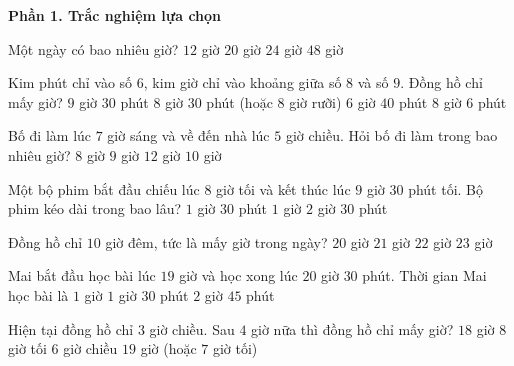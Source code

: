 \textbf{Phần 1. Trắc nghiệm lựa chọn}

\begin{ex} %
Một ngày có bao nhiêu giờ?
\choice
{$12$ giờ}
{$20$ giờ}
{\True $24$ giờ}
{$48$ giờ}
\end{ex}

\begin{ex} %
Kim phút chỉ vào số $6$, kim giờ chỉ vào khoảng giữa số $8$ và số $9$. Đồng hồ chỉ mấy giờ?
\choice
{$9$ giờ $30$ phút}
{\True $8$ giờ $30$ phút (hoặc $8$ giờ rưỡi)}
{$6$ giờ $40$ phút}
{$8$ giờ $6$ phút}
\end{ex}

\begin{ex} %
Bố đi làm lúc $7$ giờ sáng và về đến nhà lúc $5$ giờ chiều. Hỏi bố đi làm trong bao nhiêu giờ?
\choice
{$8$ giờ}
{$9$ giờ}
{$12$ giờ}
{\True $10$ giờ}
\end{ex}

\begin{ex} %
Một bộ phim bắt đầu chiếu lúc $8$ giờ tối và kết thúc lúc $9$ giờ $30$ phút tối. Bộ phim kéo dài trong bao lâu?
\choice
{\True $1$ giờ $30$ phút}
{$1$ giờ}
{$2$ giờ}
{$30$ phút}
\end{ex}

\begin{ex} %
Đồng hồ chỉ $10$ giờ đêm, tức là mấy giờ trong ngày?
\choice
{$20$ giờ}
{$21$ giờ}
{\True $22$ giờ}
{$23$ giờ}
\end{ex}

\begin{ex} %
Mai bắt đầu học bài lúc $19$ giờ và học xong lúc $20$ giờ $30$ phút. Thời gian Mai học bài là
\choice
{$1$ giờ}
{\True $1$ giờ $30$ phút}
{$2$ giờ}
{$45$ phút}
\end{ex}

\begin{ex} %
Hiện tại đồng hồ chỉ $3$ giờ chiều. Sau $4$ giờ nữa thì đồng hồ chỉ mấy giờ?
\choice
{$18$ giờ}
{$8$ giờ tối}
{$6$ giờ chiều}
{\True $19$ giờ (hoặc $7$ giờ tối)}
\end{ex}

